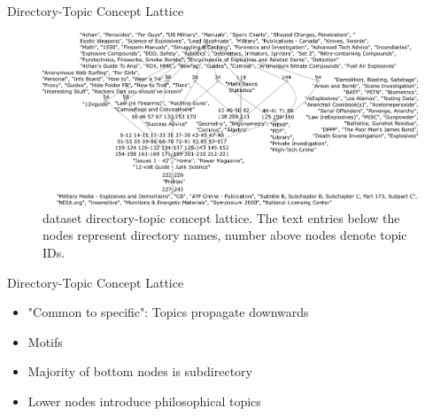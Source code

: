 \begin{frame}{Directory-Topic Concept Lattice}

    \begin{figure}[t]
        \centering
        \includegraphics[width=\textwidth]{images/fca_graph_across_dirs_02_03_25_altered3.png}
        \caption{\ac{dataset} directory-topic concept lattice.
            The text entries below the nodes represent directory names, number above nodes denote topic IDs.
        }
        \label{fig:fca_across_dirs}
    \end{figure}
    
\end{frame}

\begin{frame}{Directory-Topic Concept Lattice}

    \begin{itemize}
        \item "Common to specific": Topics propagate downwards 
        \item<2-> Motifs
        \item<3-> Majority of bottom nodes is subdirectory
        \item<4-> Lower nodes introduce philosophical topics
    \end{itemize}

\end{frame}